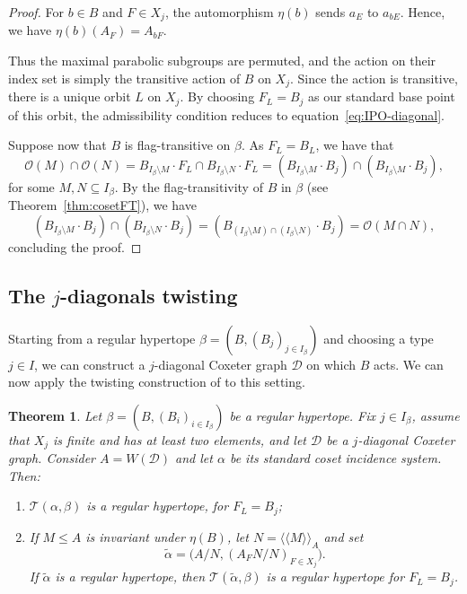 \documentclass[11pt,letterpaper]{amsart}
\newtheorem{thm}[prop]{Theorem}
\newcommand{\TT}{\mathcal{T}}
\begin{document}
\begin{proof}
For $b\in B$ and $F\in X_j$, the automorphism $\eta(b)$ sends $a_E$ to $a_{bE}$. Hence,
we have $\eta(b)(A_F)=A_{bF}$.

Thus the maximal parabolic subgroups are permuted, and the action on their index set is simply the transitive action of $B$ on $X_j$. Since the action is transitive, there is a unique orbit $L$ on $X_j$. By choosing $F_L=B_j$ as our standard base point of this orbit, the admissibility condition reduces to equation~\eqref{eq:IPO-diagonal}.

Suppose now that $B$ is flag-transitive on $\beta$. As $F_L=B_L$, we have that 
$$\mathcal{O}(M)\cap\mathcal{O}(N)= B_{I_\beta\setminus M}\cdot F_L \cap B_{I_\beta\setminus N}\cdot F_L
= (B_{I_\beta\setminus M}\cdot B_j) \cap (B_{I_\beta\setminus M}\cdot B_j),$$
for some $M,N\subseteq I_\beta$.
By the flag-transitivity of $B$ in $\beta$ (see Theorem~\ref{thm:cosetFT}), we have
$$(B_{I_\beta\setminus M}\cdot B_j) \cap (B_{I_\beta\setminus N}\cdot B_j) = (B_{(I_\beta\setminus M)\cap (I_\beta\setminus N)}\cdot B_j) = \mathcal{O}(M\cap N),
$$
concluding the proof.
\end{proof}

\subsection{The $j$-diagonals twisting}

Starting from a regular hypertope $\beta =(B,(B_j)_{j \in I_\beta})$ and choosing a type $j \in I$, we can construct a $j$-diagonal Coxeter graph $\mathcal{D}$ on which $B$ acts. We can now apply the twisting construction of \cite{wreath} to this setting.

\begin{thm}\label{thm:diagonal-twisting}
Let $\beta=(B,(B_i)_{i\in I_\beta})$ be a regular hypertope. Fix $j\in I_\beta$, assume that $X_j$ is finite and has at least two elements, and let $\mathcal{D}$ be a $j$-diagonal Coxeter graph. Consider $A=W(\mathcal{D})$ and let $\alpha$ be its standard coset incidence system. Then:
\begin{enumerate}
    \item $\TT(\alpha,\beta)$ is a regular hypertope, for $F_L=B_j$;
    \item If $M\leq A$ is invariant under $\eta(B)$, let $N=\langle\!\langle M\rangle\!\rangle_A$ and set
    \[
    \widetilde\alpha=
    \bigl(A/N,(A_FN/N)_{F\in X_j}\bigr).
    \]
    If $\widetilde\alpha$ is a regular hypertope, then $\TT(\widetilde\alpha,\beta)$ is a regular hypertope for $F_L=B_j$.
\end{enumerate}
\end{thm}
\end{document}
